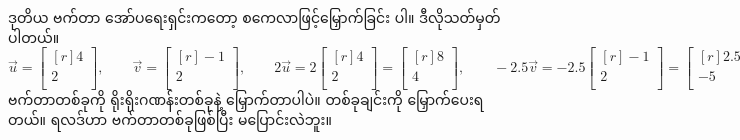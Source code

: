 ဒုတိယ ဗက်တာ အော်ပရေးရှင်းကတော့ စကေလာဖြင့်မြှောက်ခြင်း  ပါ။ ဒီလိုသတ်မှတ်ပါတယ်။
%
\[
\vec{u} = \begin{bmatrix*}[r] 4\\ 2\\ \end{bmatrix*},\qquad
\vec{v} = \begin{bmatrix*}[r] -1\\ 2\\ \end{bmatrix*},\qquad
2\vec{u}= 2\begin{bmatrix*}[r] 4\\ 2\\ \end{bmatrix*} = \begin{bmatrix*}[r] 8\\ 4\\ \end{bmatrix*},\qquad
-2.5\vec{v}= -2.5 \begin{bmatrix*}[r] -1\\ 2\\ \end{bmatrix*} = \begin{bmatrix*}[r] 2.5\\ -5\\ \end{bmatrix*}
\]
%
ဗက်တာတစ်ခုကို ရိုးရိုးဂဏန်းတစ်ခုနဲ့ မြှောက်တာပါပဲ။  တစ်ခုချင်းကို မြှောက်ပေးရတယ်။ ရလဒ်ဟာ ဗက်တာတစ်ခုဖြစ်ပြီး  မပြောင်းလဲဘူး။

